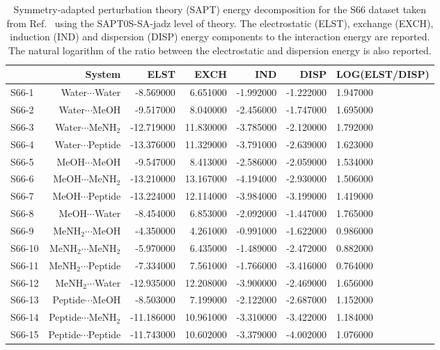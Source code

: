 \begin{table}
\caption{\label{tab:sapt_s66_decomposition}Symmetry-adapted perturbation theory (SAPT) energy decomposition for the S66 dataset taken from Ref.~ using the SAPT0S-SA-jadz level of theory. The electrostatic (ELST), exchange (EXCH), induction (IND) and dispersion (DISP) energy components to the interaction energy are reported. The natural logarithm of the ratio between the electrostatic and dispersion energy is also reported.}
\begin{adjustbox}{center}
\begin{tabular}{lrrrrr}
\toprule
 & System & ELST & EXCH & IND & DISP & LOG(ELST/DISP) \\ 
\midrule
S66-1 & Water$\cdots$Water & -8.569000 & 6.651000 & -1.992000 & -1.222000 & 1.947000 \\
S66-2 & Water$\cdots$MeOH & -9.517000 & 8.040000 & -2.456000 & -1.747000 & 1.695000 \\
S66-3 & Water$\cdots$MeNH$_2$ & -12.719000 & 11.830000 & -3.785000 & -2.120000 & 1.792000 \\
S66-4 & Water$\cdots$Peptide & -13.376000 & 11.329000 & -3.791000 & -2.639000 & 1.623000 \\
S66-5 & MeOH$\cdots$MeOH & -9.547000 & 8.413000 & -2.586000 & -2.059000 & 1.534000 \\
S66-6 & MeOH$\cdots$MeNH$_2$ & -13.210000 & 13.167000 & -4.194000 & -2.930000 & 1.506000 \\
S66-7 & MeOH$\cdots$Peptide & -13.224000 & 12.114000 & -3.984000 & -3.199000 & 1.419000 \\
S66-8 & MeOH$\cdots$Water & -8.454000 & 6.853000 & -2.092000 & -1.447000 & 1.765000 \\
S66-9 & MeNH$_2$$\cdots$MeOH & -4.350000 & 4.261000 & -0.991000 & -1.622000 & 0.986000 \\
S66-10 & MeNH$_2$$\cdots$MeNH$_2$ & -5.970000 & 6.435000 & -1.489000 & -2.472000 & 0.882000 \\
S66-11 & MeNH$_2$$\cdots$Peptide & -7.334000 & 7.561000 & -1.766000 & -3.416000 & 0.764000 \\
S66-12 & MeNH$_2$$\cdots$Water & -12.935000 & 12.208000 & -3.900000 & -2.469000 & 1.656000 \\
S66-13 & Peptide$\cdots$MeOH & -8.503000 & 7.199000 & -2.122000 & -2.687000 & 1.152000 \\
S66-14 & Peptide$\cdots$MeNH$_2$ & -11.186000 & 10.961000 & -3.310000 & -3.422000 & 1.184000 \\
S66-15 & Peptide$\cdots$Peptide & -11.743000 & 10.602000 & -3.379000 & -4.002000 & 1.076000 \\

\end{tabular}
\end{adjustbox}
\end{table}
